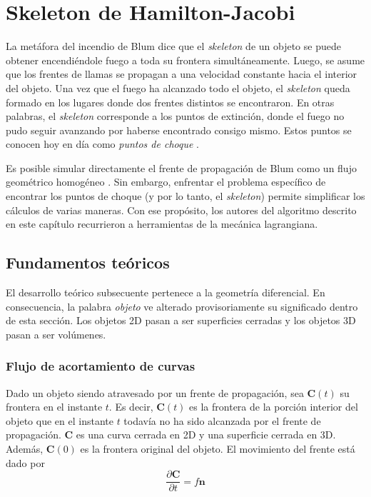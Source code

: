 \chapter{Skeleton de Hamilton-Jacobi}
\label{ch:siddiqi}

La metáfora del incendio de Blum \cite{Blum:1967} dice que el \textit{skeleton} de un objeto se puede obtener encendiéndole fuego a toda su frontera simultáneamente. Luego, se asume que los frentes de llamas se propagan a una velocidad constante hacia el interior del objeto. Una vez que el fuego ha alcanzado todo el objeto, el \textit{skeleton} queda formado en los lugares donde dos frentes distintos se encontraron. En otras palabras, el \textit{skeleton} corresponde a los puntos de extinción, donde el fuego no pudo seguir avanzando por haberse encontrado consigo mismo. Estos puntos se conocen hoy en día como \textit{puntos de choque} \cite{leymarie2003three}.

Es posible simular directamente el frente de propagación de Blum como un flujo geométrico homogéneo \cite{kimmel1995skeletonization}. Sin embargo, enfrentar el problema específico de encontrar los puntos de choque (y por lo tanto, el \textit{skeleton}) permite simplificar los cálculos de varias maneras. Con ese propósito, los autores del algoritmo descrito en este capítulo recurrieron a herramientas de la mecánica lagrangiana.

\section{Fundamentos teóricos}
 
El desarrollo teórico subsecuente pertenece a la geometría diferencial. En consecuencia, la palabra \textit{objeto} ve alterado provisoriamente su significado dentro de esta sección. Los objetos 2D pasan a ser superficies cerradas y los objetos 3D pasan a ser volúmenes.

\subsection{Flujo de acortamiento de curvas}
Dado un objeto siendo atravesado por un frente de propagación, sea $\boldsymbol{C}(t)$ su frontera en el instante $t$. Es decir, $\boldsymbol{C}(t)$ es la frontera de la porción interior del objeto que en el instante $t$ todavía no ha sido alcanzada por el frente de propagación. $\boldsymbol{C}$ es una curva cerrada en 2D y una superficie cerrada en 3D. Además, $\boldsymbol{C}(0)$ es la frontera original del objeto. El movimiento del frente está dado por
\begin{equation}
\frac{\partial{\boldsymbol{C}}}{\partial{t}} = f\boldsymbol{n}
\end{equation}

